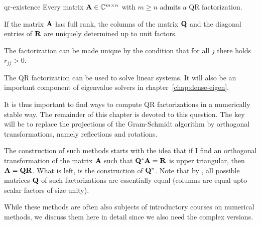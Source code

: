 \begin{Theorem}{qr-existence}
  Every matrix $\mathbf A\in\mathbb C^{m\times n}$ with $m\ge n$
  admits a QR factorization.

  If the matrix $\mathbf A$ has full rank, the columns of the matrix
  $\mathbf Q$ and the diagonal entries of $\mathbf R$ are uniquely determined
  up to unit factors.

  The factorization can be made unique by the condition that for all
  $j$ there holds $r_{jj} > 0$.
\end{Theorem}

\begin{intro}
  The QR factorization can be used to solve linear systems. It will
  also be an important component of eigenvalue solvers in
  chapter~\ref{chap:dense-eigen}.

  It is thus important to find ways to compute QR factorizations in a
  numerically stable way. The remainder of this chapter is devoted to
  this question. The key will be to replace the projections of the
  Gram-Schmidt algorithm by orthogonal transformations, namely
  reflections and rotations.

  The construction of such methods starts with the idea that if I find
  an orthogonal transformation of the matrix $\mathbf A$ such that
  $\mathbf Q^*\mathbf A=\mathbf R$ is upper triangular, then
  $\mathbf A=\mathbf Q\mathbf R$. What is left, is the construction of
  $\mathbf Q^*$. Note that by , all
  possible matrices $\mathbf Q$ of such factorizations are essentially
  equal (columns are equal upto scalar factors of size unity).

  While these methods are often also subjects of introductory courses
  on numerical methods, we discuss them here in detail since we also
  need the complex versions.
\end{intro}

